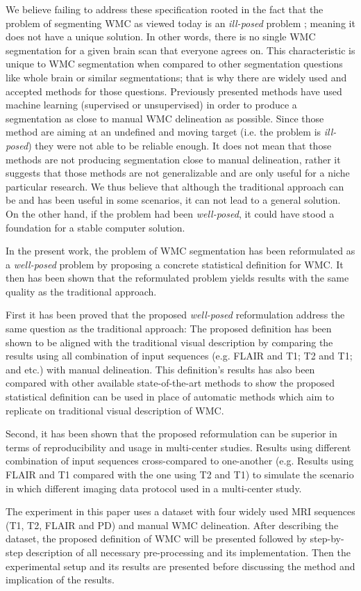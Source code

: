 We believe failing to address these specification rooted in the fact that the problem of segmenting WMC as viewed today is an \textit{ill-posed} problem \cite{IllPosed}; meaning it does not have a unique solution. In other words, there is no single WMC segmentation for a given brain scan that everyone agrees on. This characteristic is unique to WMC segmentation when compared to other segmentation questions like whole brain or similar segmentations; that is why there are widely used and accepted methods for those questions. Previously presented methods have used machine learning (supervised or unsupervised) in order to produce a segmentation as close to manual WMC delineation as possible. Since those method are aiming at an undefined and moving target (i.e. the problem is \textit{ill-posed}) they were not able to be reliable enough. It does not mean that those methods are not producing segmentation close to manual delineation, rather it suggests that those methods are not generalizable and are only useful for a niche particular research. We thus believe that although the traditional approach can be and has been useful in some scenarios, it can not lead to a general solution. On the other hand, if the problem had been \textit{well-posed}, it could have stood a foundation for a stable computer solution.

In the present work, the problem of WMC segmentation has been reformulated as a \textit{well-posed} problem by proposing a concrete statistical definition for WMC. It then has been shown that the reformulated problem yields results with the same quality as the traditional approach.

First it has been proved that the proposed \textit{well-posed} reformulation address the same question as the traditional approach: The proposed definition has been shown to be aligned with the traditional visual description by comparing the results using all combination of input sequences (e.g. FLAIR and T1; T2 and T1; and etc.) with manual delineation. This definition's results has also been compared with other available state-of-the-art methods to show the proposed statistical definition can be used in place of automatic methods which aim to replicate on traditional visual description of WMC.

Second, it has been shown that the proposed reformulation can be superior in terms of reproducibility and usage in multi-center studies. Results using different combination of input sequences cross-compared to one-another (e.g. Results using FLAIR and T1 compared with the one using T2 and T1) to simulate the scenario in which different imaging data protocol used in a multi-center study.

The experiment in this paper uses a dataset with four widely used MRI sequences (T1, T2, FLAIR and PD) and manual WMC delineation. After describing the dataset, the proposed definition of WMC will be presented followed by step-by-step description of all necessary pre-processing and its implementation. Then the experimental setup and its results are presented before discussing the method and implication of the results.

  
  
  